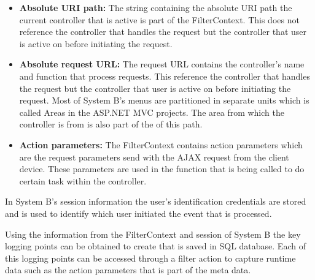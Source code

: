 \begin{itemize}
	\item \textbf{Absolute URI path:} The string containing the absolute URI path the current controller that is active is part of the FilterContext. This does not reference the controller that handles the request but the controller that user is active on before initiating the request. 
	\item \textbf{Absolute request URL:} The request URL contains the controller's name and function that process requests. This reference the controller that handles the request but the controller that user is active on before initiating the request. Most of System B's menus are partitioned in separate units which is called Areas in the ASP.NET MVC projects. The area from which the controller is from is also part of the of this path.
	\item \textbf{Action parameters:} The FilterContext contains action parameters which are the request parameters send with the AJAX request from the client device. These parameters are used in the function that is being called to do certain task within the controller.
\end{itemize}

In System B's session information the user's identification credentials are stored and is used to identify which user initiated the event that is processed.

\clearpage

Using the information from the FilterContext and session of System B the key logging points can be obtained to create  that is saved in SQL database. Each of this logging points can be accessed through a filter action to capture runtime data such as the action parameters that is part of the meta data.

